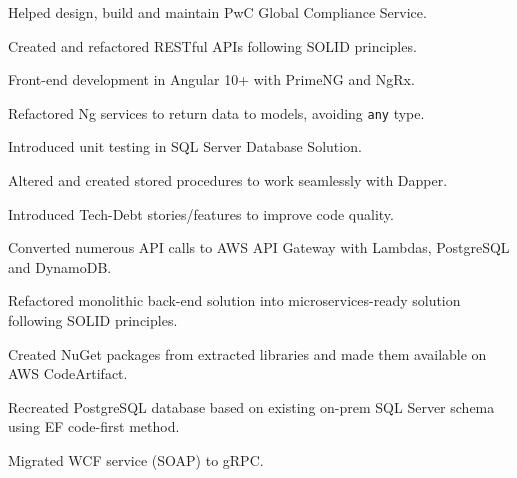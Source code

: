 \documentclass[letterpaper]{cv_12} %
\begin{document}
\begin{minipage}[t]{0.59\textwidth}
    \begin{tightitemize}
        \item Helped design, build and maintain PwC Global Compliance Service.
        \item Created and refactored RESTful APIs following SOLID
        principles.
        \item Front-end development in Angular 10+ with PrimeNG and
        NgRx.
        \item Refactored Ng services to return data to models, avoiding
        \verb|any| type.
        \item Introduced unit testing in SQL Server Database Solution.
        \item Altered and created stored procedures to work seamlessly
        with Dapper.
        \item Introduced Tech-Debt stories/features to improve code
        quality.
    \end{tightitemize}

    \sectionspace%


    \begin{tightitemize}
        \item Converted numerous API calls to AWS API Gateway with
        Lambdas, PostgreSQL and DynamoDB.\@
        \item Refactored monolithic back-end solution into
        microservices-ready solution following SOLID principles.\@
        \item Created NuGet packages from extracted libraries and made
        them available on AWS CodeArtifact.
        \item Recreated PostgreSQL database based on existing on-prem
        SQL Server schema using EF code-first method.
        \item Migrated WCF service (SOAP) to gRPC.\@
    \end{tightitemize}

    \sectionspace%



\end{minipage}
\end{document}
